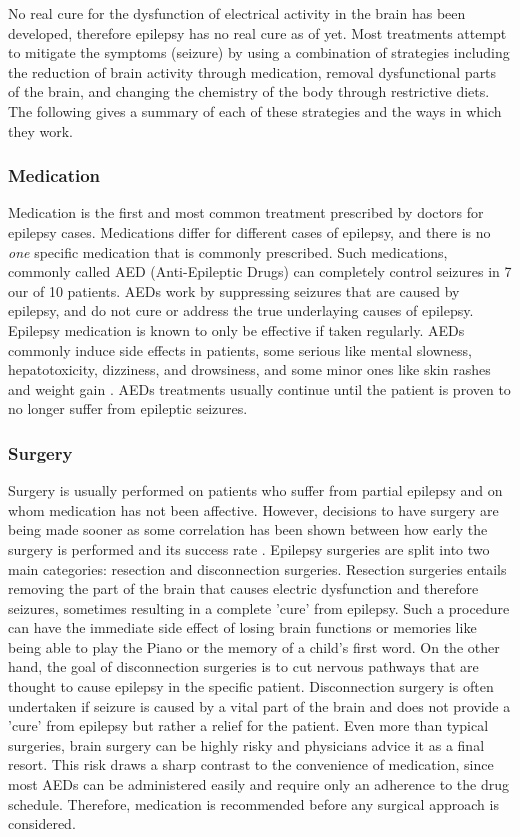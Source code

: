 No real cure for the dysfunction of electrical activity in the brain has been developed, therefore epilepsy has no real cure as of yet. Most treatments attempt to mitigate the symptoms (seizure) by using a combination of strategies including the reduction of brain activity through medication, removal dysfunctional parts of the brain, and changing the chemistry of the body through restrictive diets. The following gives a summary of each of these strategies and the ways in which they work.

\subsubsection{Medication}
Medication is the first and most common treatment prescribed by doctors for epilepsy cases. Medications differ for different cases of epilepsy, and there is no \textit{one} specific medication that is commonly prescribed. Such medications, commonly called AED (Anti-Epileptic Drugs) can completely control seizures in 7 our of 10 patients. AEDs work by suppressing seizures that are caused by epilepsy, and do not cure or address the true underlaying causes of epilepsy. Epilepsy medication is known to only be effective if taken regularly. AEDs commonly induce side effects in patients, some serious like mental slowness, hepatotoxicity, dizziness, and drowsiness, and some minor ones like skin rashes and weight gain \cite{AEDsideeffects}. AEDs treatments usually continue until the patient is proven to no longer suffer from epileptic seizures.

\subsubsection{Surgery}
Surgery is usually performed on patients who suffer from partial epilepsy and on whom medication has not been affective. However, decisions to have surgery are being made sooner as some correlation has been shown between how early the surgery is performed and its success rate \cite{Epilepsy.com.surgery}. Epilepsy surgeries are split into two main categories: resection and disconnection surgeries. Resection surgeries entails removing the part of the brain that causes electric dysfunction and therefore seizures, sometimes resulting in a complete 'cure' from epilepsy. Such a procedure can have the immediate side effect of losing brain functions or memories like being able to play the Piano or the memory of a child's first word. On the other hand, the goal of disconnection surgeries is to cut nervous pathways that are thought to cause epilepsy in the specific patient. Disconnection surgery is often undertaken if seizure is caused by a vital part of the brain and does not provide a 'cure' from epilepsy but rather a relief for the patient.
Even more than typical surgeries, brain surgery can be highly risky and physicians advice it as a final resort. This risk draws a sharp contrast to the convenience of medication, since most AEDs can be administered easily and require only an adherence to the drug schedule. Therefore, medication is recommended before any surgical approach is considered.

